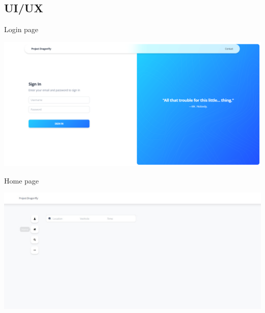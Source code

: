 \documentclass{beamer}
\begin{document}
	\subsection{UI/UX}	
	\begin{frame}{Login page}
		\begin{center}
			\includegraphics[width=1\linewidth]{res/loginpage}
		\end{center}
	\end{frame}

	\begin{frame}{Home page}
		\begin{center}
			\includegraphics[width=1\linewidth]{res/homepage}
		\end{center}
	\end{frame}
\end{document}
